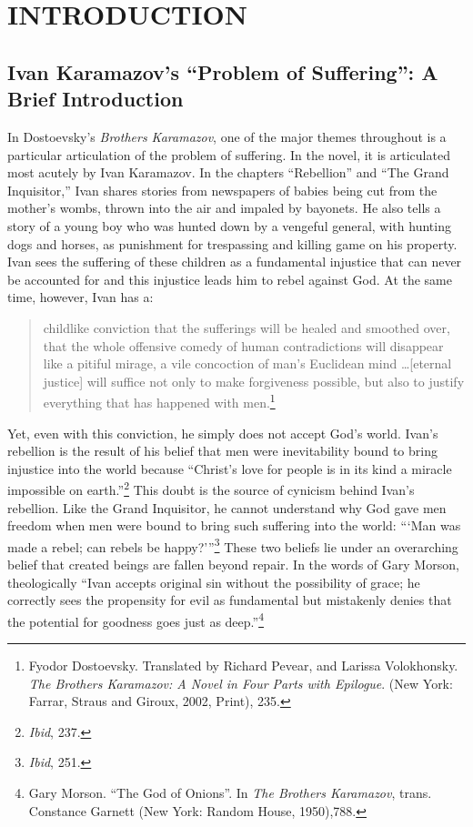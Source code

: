 \tableofcontents
\chapter{INTRODUCTION}

\pagestyle{myheadings}

\label{introduction}
\section{Ivan Karamazov's ``Problem of Suffering'': A Brief Introduction}
In Dostoevsky's {\emph{Brothers Karamazov}}, one of the major themes throughout is a particular articulation of the problem of suffering. In the novel, it is articulated most acutely by Ivan Karamazov. In the chapters ``Rebellion'' and ``The Grand Inquisitor,'' Ivan shares stories from newspapers of babies being cut from the mother's wombs, thrown into the air and impaled by bayonets. He also tells a story of a young boy who was hunted down by a vengeful general, with hunting dogs and horses, as punishment for trespassing and killing game on his property. Ivan sees the suffering of these children as a fundamental injustice that can never be accounted for and this injustice leads him to rebel against God. At the same time, however, Ivan has a:

\begin{quote}
\singlespacing
childlike conviction that the sufferings will be healed and smoothed over, that the whole offensive comedy of human contradictions will disappear like a pitiful mirage, a vile concoction of man's Euclidean mind \ldots [eternal justice] will suffice not only to make forgiveness possible, but also to justify everything that has happened with men.\footnote{Fyodor Dostoevsky. Translated by Richard Pevear, and Larissa Volokhonsky. \emph{The Brothers Karamazov: A Novel in Four Parts with Epilogue}. (New York: Farrar, Straus and Giroux, 2002, Print), 235.}
\end{quote}

Yet, even with this conviction, he simply does not accept God's world. Ivan's rebellion is the result of his belief that men were inevitability bound to bring injustice into the world because ``Christ's love for people is in its kind a miracle impossible on earth.''\footnote{\emph{Ibid}, 237.} This doubt is the source of cynicism behind Ivan's rebellion. Like the Grand Inquisitor, he cannot understand why God gave men freedom when men were bound to bring such suffering into the world: ```Man was made a rebel; can rebels be happy?'''\footnote{\emph{Ibid}, 251.} These two beliefs lie under an overarching belief that created beings are fallen beyond repair. In the words of Gary Morson, theologically ``Ivan accepts original sin without the possibility of grace; he correctly sees the propensity for evil as fundamental but mistakenly denies that the potential for goodness goes just as deep.''\footnote{Gary Morson. ``The God of Onions''. In \emph{The Brothers Karamazov}, trans. Constance Garnett (New York: Random House, 1950),788.}


